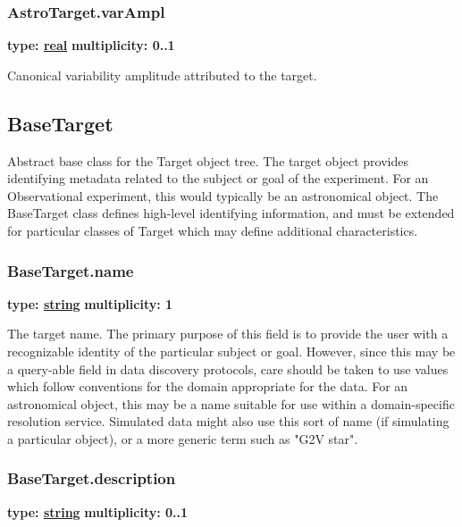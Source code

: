   \subsubsection{AstroTarget.varAmpl}
  \textbf{type: \hyperref[sect:ivoa]{real}} \newline
  \textbf{multiplicity: 0..1} \newline

  Canonical variability amplitude attributed to the target.


\pagebreak
\subsection{BaseTarget}
\label{sect:basetarget}

  Abstract base class for the Target object tree. The target object provides
  identifying metadata related to the subject or goal of the experiment. For an
  Observational experiment, this would typically be an astronomical object. The
  BaseTarget class defines high-level identifying information, and must be
  extended for particular classes of Target which may define additional characteristics.

  \subsubsection{BaseTarget.name}
  \textbf{type: \hyperref[sect:ivoa]{string}} \newline
  \textbf{multiplicity: 1} \newline

  The target name. The primary purpose of this field is to provide the user with
  a recognizable identity of the particular subject or goal. However, since this
  may be a query-able field in data discovery protocols, care should be taken to
  use values which follow conventions for the domain appropriate for the data.
  For an astronomical object, this may be a name suitable for use within a
  domain-specific resolution service. Simulated data might also use this sort of
  name (if simulating a particular object), or a more generic term such as "G2V star".
  
  \subsubsection{BaseTarget.description}
  \textbf{type: \hyperref[sect:ivoa]{string}} \newline
  \textbf{multiplicity: 0..1} \newline

